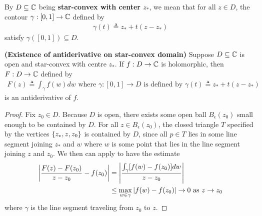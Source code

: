 \documentclass{report}
\begin{document}
\begin{mdframed}
By $D\subseteq \mathbb{C}$ being \textbf{star-convex with center $z_*$}, we mean that for all $z \in D$, the contour $\gamma :[0,1]\rightarrow \mathbb{C}$ defined by 
\begin{align*}
\gamma (t)\triangleq z_*+t(z-z_*)
\end{align*}
satisfy $\gamma ([0,1])\subseteq D$. 
\end{mdframed}
\begin{theorem}
\textbf{(Existence of antiderivative on star-convex domain)} Suppose $D\subseteq \mathbb{C}$ is open and star-convex with centre  $z_*$. If $f:D\rightarrow \mathbb{C}$ is holomorphic, then $F:D\rightarrow \mathbb{C}$ defined by 
\begin{align*}
F(z)\triangleq \int_\gamma f(w)dw\text{ where }\gamma :[0,1]\rightarrow D\text{ is defined by }\gamma(t)\triangleq z_*+t(z-z_*)
\end{align*}
is an antiderivative of $f$. 
\end{theorem}
\begin{proof}
Fix $z_0 \in D$. Because $D$ is open, there exists some open ball $B_\epsilon (z_0)$ small enough to be contained by $D$. For all $z\in B_\epsilon (z_0)$, the closed triangle $T$ specified by the vertices $\{ z_*,z,z_0 \}$ is contained by $D$, since all $p\in  T$ lies in some line segment joining $z_*$ and $w$ where $w$ is some point that lies in the line segment joining $z$ and  $z_0$.  We then can apply  to have the estimate 
\begin{align*}
  \left|\frac{F(z)-F(z_0)}{z-z_0}-f(z_0)\right|&= \left|\frac{\int_\gamma [f(w)-f(z_0)]dw}{z-z_0}\right|\\
  &\leq \max_{w \in \gamma }\left|f(w)-f(z_0)\right|\to 0\text{ as }z \to z_0
\end{align*}
where $\gamma$ is the line segment traveling from $z_0$ to  $z$.  
\end{proof}
\end{document}
